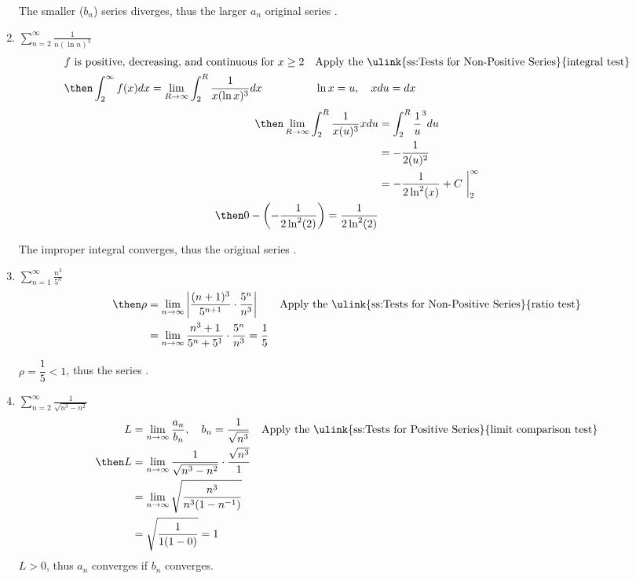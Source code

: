 \begin{enumerate}[itemsep=12em]
  The smaller (\(b_n\)) series diverges, thus the larger \(a_n\) original
  series .

  \item \(\displaystyle \sum_{n=2}^{\infty} \frac{1}{n(\ln n)^3} \)
  \begin{align*}
    &f~\text{is positive, decreasing, and continuous for}~x\geq 2
    && \text{Apply the \ulink{ss:Tests for Non-Positive Series}{integral test}} \\
    &\then \int_{2}^{\infty} f(x)dx = \lim_{R \to \infty} \int_{2}^{R}
    \frac{1}{x(\ln x)^3} dx &
    &\ln x = u, \quad xdu = dx
  \end{align*}
  \begin{align*}
    \then \lim_{R \to \infty} \int_{2}^{R} \frac{1}{x(u)^3} xdu &=
    \int_{2}^{R} \frac{1}{u}^3 du \\
     &= -\frac{1}{2(u)^2} \\
     &= -\frac{1}{2\ln ^2(x)} + C ~\bigg|_{2}^{\infty} \\
    \then 0 - \left(-\frac{1}{2\ln ^2(2)}\right) = \frac{1}{2\ln ^2(2)}
  \end{align*}

  The improper integral converges, thus the original series .

  \item \(\displaystyle \sum_{n=1}^{\infty} \frac{n^3}{5^n} \)
    \begin{align*}
      \then \rho &= \lim_{n \to \infty} \left| \frac{(n+1)^3}{5^{n+1} }
      \cdot \frac{5^n}{n^3} \right|
     && \text{Apply the \ulink{ss:Tests for Non-Positive Series}{ratio test}} \\
      &= \lim_{n \to \infty} \frac{n^3+1}{5^n + 5^1}
      \cdot \frac{5^n}{n^3} = \frac{1}{5}
    \end{align*}

  \(\rho = \dfrac{1}{5} < 1\), thus the series .


  \item \(\displaystyle \sum_{n=2}^{\infty} \frac{1}{\sqrt{n^3 - n^2}} \)
    \begin{align*}
      L &= \lim_{n \to \infty} \frac{a_n}{b_n}, \quad b_n = \frac{1}{\sqrt{n^3} }
      && \text{Apply the \ulink{ss:Tests for Positive Series}{limit comparison test}} \\
      \then L &= \lim_{n \to \infty} \frac{1}{\sqrt{n^3 - n^2}}
      \cdot \frac{\sqrt{n^3}}{1} \\
      &= \lim_{n \to \infty} \sqrt{\frac{n^3}{n^3(1-n ^{-1})}} \\
      &= \sqrt{\frac{1}{1(1-0)}} = 1
    \end{align*}
    \(L > 0\), thus \(a_n\) converges if \(b_n\) converges.


\end{enumerate}
